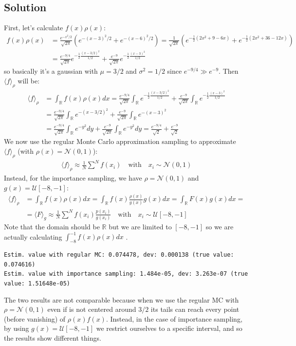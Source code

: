\documentclass[../main.tex]{subfiles}
\begin{document}
\subsection{Solution}
First, let's calculate $f(x)\rho(x)$:
\begin{align}
   f(x)\rho(x) &=  \frac{e^{-x^2/2}}{\sqrt{2\pi}}\left( e^{-(x-3)^2/2} + e^{-(x-6)^2/2} \right) = \frac{1}{\sqrt{2\pi}}\left( e^{-\frac{1}{2}(2x^2+9-6x)} + e^{-\frac{1}{2}(2x^2+36-12x)} \right)\\
   &= \frac{e^{-9/4}}{\sqrt{2\pi}} e^{-\frac{1}{2}\frac{(x-3/2)^2}{1/2}} + \frac{e^{-9}}{\sqrt{2\pi}} e^{-\frac{1}{2}\frac{(x-3)^2}{1/2}}
\end{align} so basically it's a gaussian with $\mu=3/2$ and $\sigma^2 = 1/2$ since $e^{-9/4} \gg e^{-9}$. Then $\langle f \rangle_\rho$ will be:
\begin{align}
    \langle f \rangle_\rho &= \int_\mathbb{R} f(x)\rho(x)dx = \frac{e^{-9/4}}{\sqrt{2\pi}} \int_\mathbb{R} e^{-\frac{1}{2}\frac{(x-3/2)^2}{1/2}} +  \frac{e^{-9}}{\sqrt{2\pi}} \int_\mathbb{R} e^{-\frac{1}{2}\frac{(x-3)^2}{1/2}} \\
    &= \frac{e^{-9/4}}{\sqrt{2\pi}} \int_\mathbb{R} e^{-(x-3/2)^2} +  \frac{e^{-9}}{\sqrt{2\pi}} \int_\mathbb{R} e^{-(x-3)^2} \\
    &= \frac{e^{-9/4}}{\sqrt{2\pi}} \int_\mathbb{R}e^{-y^2}dy +  \frac{e^{-9}}{\sqrt{2\pi}} \int_\mathbb{R} e^{-y^2}dy = \frac{e^{-9/4}}{\sqrt{2}} + \frac{e^{-9}}{\sqrt{2}}
\end{align}
We now use the regular Monte Carlo approximation sampling to approximate $\langle f \rangle_\rho$ (with $\rho(x)=\mathcal{N}(0,1)$):
\begin{align}
    \langle f \rangle_\rho \approx \frac{1}{N} \sum^N f(x_i)\quad \text{with}\quad x_i \sim \mathcal{N}(0,1)
\end{align}
Instead, for the importance sampling, we have $\rho=\mathcal{N}(0,1)$ and $g(x) = \mathcal{U}[-8, -1]$:
\begin{align}
    \langle f \rangle_\rho &= \int_\mathbb{R} f(x)\rho(x)dx = \int_\mathbb{R} f(x)\frac{\rho(x)}{g(x)}g(x)dx = \int_\mathbb{R}F(x)g(x)dx =  \\
    &= \langle F \rangle_g \approx \frac{1}{N} \sum^N f(x_i)\frac{p(x_i)}{g(x_i)}\quad \text{with}\quad x_i \sim \mathcal{U}[-8, -1]
\end{align}Note that the domain should be $\mathbb{R}$ but we are limited to $[-8, -1]$ so we are actually calculating $\int_{-8}^{-1}f(x)\rho(x)dx$ .

\begin{verbatim}
Estim. value with regular MC: 0.074478, dev: 0.000138 (true value: 0.074616)
Estim. value with importance sampling: 1.484e-05, dev: 3.263e-07 (true value: 1.51648e-05)
\end{verbatim}
The two results are not comparable because when we use the regular MC with $\rho=\mathcal{N}(0,1)$ even if is not centered around $3/2$ its tails can reach every point (before vanishing) of $\rho(x)f(x)$. Instead, in the case of importance sampling, by using $g(x) = \mathcal{U}[-8, -1]$ we restrict ourselves to a specific interval, and so the results show different things.
\end{document}
